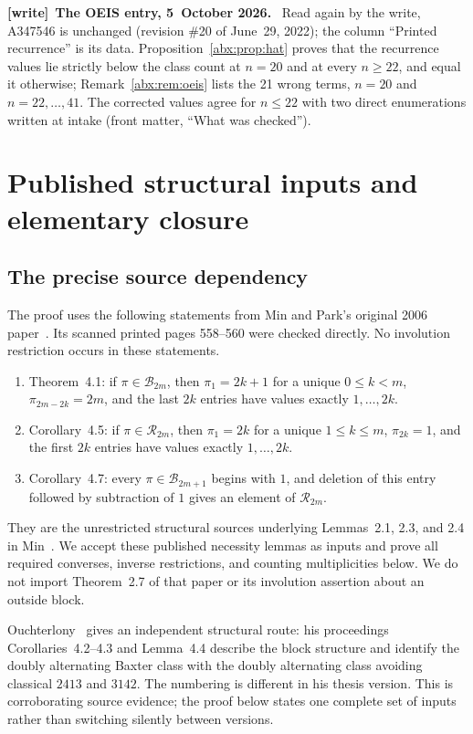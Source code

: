 \documentclass[11pt,letterpaper]{article}
\numberwithin{equation}{section}
\theoremstyle{remark}\newtheorem{remark}[theorem]{Remark}
\newcommand{\BB}{\mathcal B}
\newcommand{\RR}{\mathcal R}
\newenvironment{writenote}[1][]{\par\smallskip\begingroup\small
 \noindent\textbf{[write]}\if\relax\detokenize{#1}\relax\else~\textbf{#1.}\fi\ }%
 {\par\endgroup\smallskip}
\begin{document}
\begin{writenote}[The OEIS entry, 5~October 2026]
Read again by the write, A347546 is unchanged (revision \#20 of June~29, 2022); the column ``Printed recurrence'' is its data. Proposition~\ref{abx:prop:hat} proves that the recurrence values lie strictly below the class count at $n=20$ and at every $n\ge22$, and equal it otherwise; Remark~\ref{abx:rem:oeis} lists the 21 wrong terms, $n=20$ and $n=22,\ldots,41$. The corrected values agree for $n\le22$ with two direct enumerations written at intake (front matter, ``What was checked'').
\end{writenote}

\section{Published structural inputs and elementary closure}\label{abx:en:sec:inputs}
\subsection{The precise source dependency}\label{abx:en:sub:source}
The proof uses the following statements from Min and Park's original
2006 paper~\cite{minpark}. Its scanned printed pages 558--560 were
checked directly. No involution restriction occurs in these statements.
\begin{enumerate}
\item Theorem~4.1: if $\pi\in\BB_{2m}$, then
$\pi_1=2k+1$ for a unique $0\le k<m$,
$\pi_{2m-2k}=2m$, and the last $2k$ entries have values exactly
$1,\ldots,2k$.
\item Corollary~4.5: if $\pi\in\RR_{2m}$, then
$\pi_1=2k$ for a unique $1\le k\le m$,
$\pi_{2k}=1$, and the first $2k$ entries have values exactly
$1,\ldots,2k$.
\item Corollary~4.7: every $\pi\in\BB_{2m+1}$ begins with $1$,
and deletion of this entry followed by subtraction of $1$ gives
an element of $\RR_{2m}$.
\end{enumerate}
They are the unrestricted structural sources underlying Lemmas~2.1,
2.3, and 2.4 in Min~\cite{min2021}. We accept these published necessity
lemmas as inputs and prove all required converses, inverse restrictions,
and counting multiplicities below. We do not import Theorem~2.7 of
that paper or its involution assertion about an outside block.

Ouchterlony~\cite{ouchterlony} gives an independent structural route:
his proceedings Corollaries~4.2--4.3 and Lemma~4.4 describe the
block structure and identify the doubly alternating Baxter class with
the doubly alternating class avoiding classical $2413$ and $3142$.
The numbering is different in his thesis version. This is corroborating
source evidence; the proof below states one complete set of inputs
rather than switching silently between versions.
\end{document}
